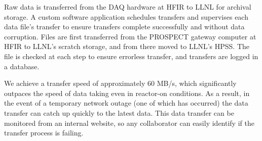 

Raw data is transferred from the DAQ hardware at HFIR to LLNL for archival storage.
A custom software application schedules transfers and supervises each data file's transfer to ensure transfers complete successfully and without data corruption.
Files are first transferred from the PROSPECT gateway computer at HFIR to LLNL's scratch storage, and from there moved to LLNL's HPSS.
The file is checked at each step to ensure errorless transfer, and transfers are logged in a database.

We achieve a transfer speed of approximately 60 MB/s, which significantly outpaces the speed of data taking even in reactor-on conditions.
As a result, in the event of a temporary network outage (one of which has occurred) the data transfer can catch up quickly to the latest data.
This data transfer can be monitored from an internal website, so any collaborator can easily identify if the transfer process is failing.
